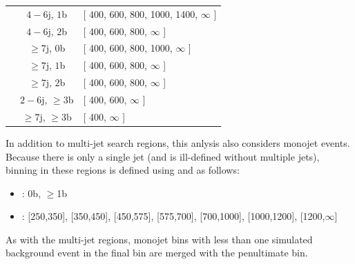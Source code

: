\begin{table}
\begin{tabular}{ccl}
 & $4-6$j, $  1$b  &  [ 400, 600, 800, 1000, 1400,  $\infty$  ] \\

 & $4-6$j, $  2$b  &  [ 400, 600, 800,  $\infty$  ] \\

 & $\geq7$j, $  0$b  &  [ 400, 600, 800, 1000,  $\infty$  ] \\

 & $\geq7$j, $  1$b  &  [ 400, 600, 800,  $\infty$  ] \\

 & $\geq7$j, $  2$b  &  [ 400, 600, 800,  $\infty$  ] \\

 & $2-6$j, $  \geq3$b  &  [ 400, 600, $\infty$  ] \\

 & $\geq7$j, $  \geq3$b  &  [ 400, $\infty$ ] \\ 

\hline
	\end{tabular}
	\label{tbl:mt2bins2}
\end{table}
In addition to multi-jet search regions, this anlysis also considers monojet events. Because there is only a single jet (and \mttwo is ill-defined without multiple jets), binning in these regions is defined using \nb and \HT as follows:
\begin{itemize}
	\item \nb: 0b, $\geq$1b
	\item \HT: [250,350], [350,450], [450,575], [575,700], [700,1000], [1000,1200], [1200,$\infty$]
\end{itemize}
As with the multi-jet regions, monojet \HT bins with less than one simulated background event in the final bin are merged with the penultimate bin.

